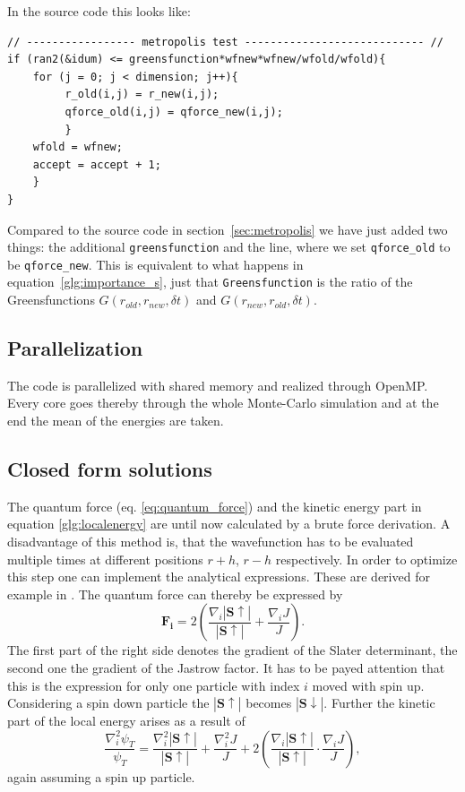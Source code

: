 In the source code this looks like:
\begin{lstlisting}
// ----------------- metropolis test ---------------------------- //
if (ran2(&idum) <= greensfunction*wfnew*wfnew/wfold/wfold){
    for (j = 0; j < dimension; j++){
         r_old(i,j) = r_new(i,j);
         qforce_old(i,j) = qforce_new(i,j); 
         }
    wfold = wfnew;
    accept = accept + 1;
    }
}
\end{lstlisting}
Compared to the source code in section~\ref{sec:metropolis} we have just added two things: the additional \texttt{greensfunction} and the line, where we set \texttt{qforce\_old} to be \texttt{qforce\_new}. This is equivalent to what happens in equation~\ref{glg:importance_s}, just that \texttt{Greensfunction} is the ratio of the Greensfunctions $G(r_{old},r_{new},\delta t)$ and $G(r_{new},r_{old},\delta t)$.


\subsection{Parallelization}
The code is parallelized with shared memory and realized through OpenMP. Every core goes thereby through the whole Monte-Carlo simulation and at the end the mean of the energies are taken. 


\subsection{Closed form solutions}\label{sec:closed_form}
The quantum force (eq. \ref{eq:quantum_force}) and the kinetic energy part in equation \ref{glg:localenergy} are until now calculated by a brute force derivation. A disadvantage of this method is, that the wavefunction has to be evaluated multiple times at different positions $r+h$, $r-h$ respectively. In order to optimize this step one can implement the analytical expressions. These are derived for example in \citet{hogberget2013}. The quantum force can thereby be expressed by
\begin{equation}
\mathbf{F_i} = 2 \left( \frac{\nabla_i |\mathbf{S\uparrow}|}{|\mathbf{S\uparrow}|} + \frac{\nabla_i J}{J} \right).
\end{equation}
The first part of the right side denotes the gradient of the Slater determinant, the second one the gradient of the Jastrow factor. It has to be payed attention that this is the expression for only one particle with index $i$ moved with spin up. Considering a spin down particle the $|\mathbf{S\uparrow}|$ becomes $|\mathbf{S\downarrow}|$. Further the kinetic part of the local energy arises as a result of
\begin{equation}
\frac{\nabla_i^2 \psi_T}{\psi_T} = \frac{\nabla_i^2 |\mathbf{S\uparrow}|}{|\mathbf{S\uparrow}|} + \frac{\nabla_i^2 J}{J} + 2\left( \frac{\nabla_i |\mathbf{S\uparrow}|}{|\mathbf{S\uparrow}|} \cdot \frac{\nabla_i J}{J} \right),
\end{equation}
again assuming a spin up particle.

